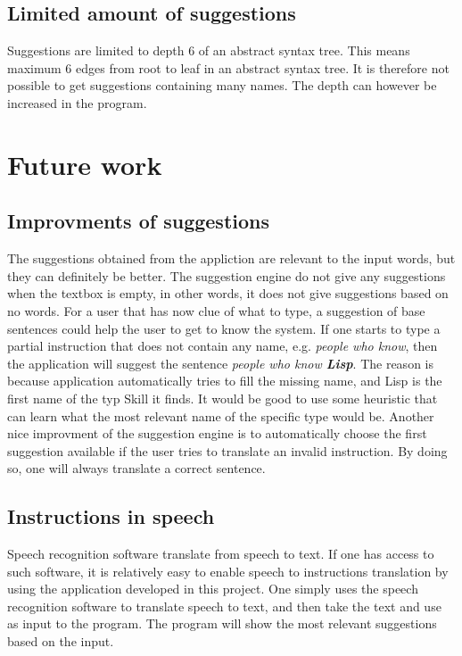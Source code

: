 \subsection*{Limited amount of suggestions}
Suggestions are limited to depth 6 of an abstract syntax tree. This means maximum 6 edges from root to leaf in an abstract syntax tree. It is therefore not possible to get suggestions containing many names. The depth can however be increased in the program.

\section{Future work}
\subsection*{Improvments of suggestions}
The suggestions obtained from the appliction are relevant to the input words, but they can definitely be better. The suggestion engine do not give any suggestions when the textbox is empty, in other words, it does not give suggestions based on no words. For a user that has now clue of what to type, a suggestion of base sentences could help the user to get to know the system.
\newline
\newline
If one starts to type a partial instruction that does not contain any name, e.g. \emph{people who know}, then the application will suggest the sentence \emph{people who know \textbf{Lisp}}. The reason is because application automatically tries to fill the missing name, and Lisp is the first name of the typ Skill it finds. It would be good to use some heuristic that can learn what the most relevant name of the specific type would be.
\newline
\newline
Another nice improvment of the suggestion engine is to automatically choose the first suggestion available if the user tries to translate an invalid instruction. By doing so, one will always translate a correct sentence.

\subsection*{Instructions in speech}
Speech recognition software translate from speech to text. If one has access to such software, it is relatively easy to enable speech to instructions translation by using the application developed in this project. One simply uses the speech recognition software to translate speech to text, and then take the text and use as input to the program. The program will show the most relevant suggestions based on the input.

